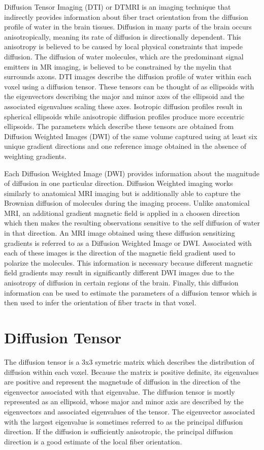 Diffusion Tensor Imaging (DTI) or DTMRI is an imaging technique that indirectly provides information about fiber tract orientation from the diffusion profile of water in the brain tissues. Diffusion in many parts of the brain occurs anisotropically, meaning its rate of diffusion is directionally dependent.  This anisotropy is believed to be caused by local physical constraints that impede diffusion.  The diffusion of water molecules, which are the predominant signal emitters in MR imaging, is believed to be constrained by the myelin that surrounds axons.  DTI images describe the diffusion profile of water within each voxel using a diffusion tensor.  These tensors can be thought of as ellipsoids with the eigenvectors describing the major and minor axes of the ellipsoid and the associated eigenvalues scaling these axes.  Isotropic diffusion profiles result in spherical ellipsoids while anisotropic diffusion profiles produce more eccentric ellipsoids.  The parameters which describe these tensors are obtained from Diffusion Weighted Images (DWI) of the same volume captured using at least six unique gradient directions and one reference image obtained in the absence of weighting gradients.

Each Diffusion Weighted Image (DWI) provides information about the magnitude of diffusion in one particular direction.  Diffusion Weighted imaging works similarly to anatomical MRI imaging but is additionally able to capture the Brownian diffusion of molecules during the imaging process.  Unlike anatomical MRI, an additional gradient magnetic field is applied in a choosen direction which then makes the resulting observations sensitive to the self diffusion of water in that direction. An MRI image obtained using these diffusion sensitizing gradients is referred to as a Diffusion Weighted Image or DWI.  Associated with each of these images is the direction of the magnetic field gradient used to polarize the molecules.  This information is necessary because different magnetic field gradients may result in significantly different DWI images due to the anisotropy of diffusion in certain regions of the brain.  Finally, this diffusion information can be used to estimate the parameters of a diffusion tensor which is then used to infer the orientation of fiber tracts in that voxel.

\section{Diffusion Tensor}
The diffusion tensor is a 3x3 symetric matrix which describes the distribution of diffusion within each voxel.  Because the matrix is positive definite, its eigenvalues are positive and represent the magnetude of diffusion in the direction of the eigenvector associated with that eigenvalue.  The diffusion tensor is mostly represented as an ellipsoid, whose major and minor axis are described by the eigenvectors and associated eigenvalues of the tensor.  The eigenvector associated with the largest eigenvalue is sometimes referred to as the principal diffusion direction.  If the diffusion is sufficiently anisotropic, the principal diffusion direction is a good estimate of the local fiber orientation. %

